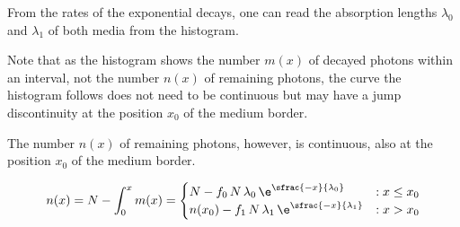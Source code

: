 From the rates of the exponential decays, one can read the absorption lengths $\lambda_0$ and $\lambda_1$ of both media from the histogram.

Note that as the histogram shows the number $m(x)$ of decayed photons within an interval, not the number $n(x)$ of remaining photons, the curve the histogram follows does not need to be continuous but may have a jump discontinuity at the position $x_0$ of the medium border.

The number $n(x)$ of remaining photons, however, is continuous, also at the position $x_0$ of the medium border.

$$
  n(x) = N - \int_0^x m(x) = \begin{cases}
    N - f_0\,N\,\lambda_0\,\e^{\sfrac{-x}{\lambda_0}} & : x \leq x_0 \\
    n(x_0) - f_1\,N\,\lambda_1\,\e^{\sfrac{-x}{\lambda_1}} & : x > x_0
  \end{cases}
$$

